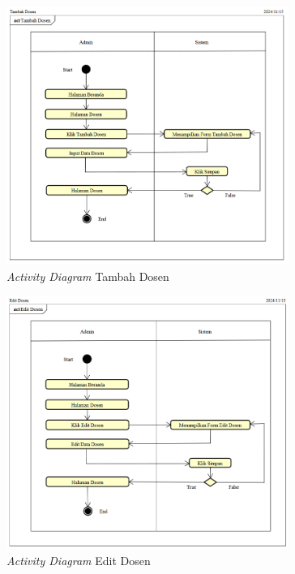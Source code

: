 \begin{figure}
	\centering
	\includegraphics[width=0.82\textwidth]{konten/gambar/activity-diagram/tambah-dosen.png}
	\caption{\textit{Activity Diagram} Tambah Dosen}
	\label{activity-diagram-tambah-dosen}
\end{figure}

\begin{figure}
	\centering
	\includegraphics[width=0.82\textwidth]{konten/gambar/activity-diagram/edit-dosen.png}
	\caption{\textit{Activity Diagram} Edit Dosen}
	\label{activity-diagram-edit-dosen}
\end{figure}

